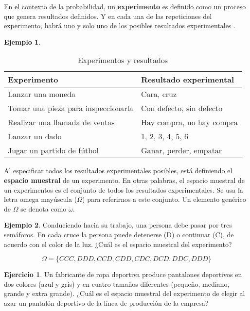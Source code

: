 \documentclass[
]{book}
\theoremstyle{definition}
\theoremstyle{definition}
\newtheorem{example}{Ejemplo}[chapter]
\theoremstyle{definition}
\newtheorem{exercise}{Ejercicio}[chapter]
\theoremstyle{definition}
\theoremstyle{remark}
\begin{document}
En el contexto de la probabilidad, un \textbf{experimento} es definido como un proceso que genera resultados definidos. Y en cada una de las repeticiones del experimento, habrá uno y solo uno de los posibles resultados experimentales \citep[página 143]{anderson}.

\begin{example}
\leavevmode

\begin{table}[H]

\caption{\label{tab:experimentos}Experimentos y resultados}
\centering
\begin{tabular}[t]{ll}
\toprule
Experimento & Resultado experimental\\
\midrule
Lanzar una moneda & Cara, cruz\\
Tomar una pieza para inspeccionarla & Con defecto, sin defecto\\
Realizar una llamada de ventas & Hay compra, no hay compra\\
Lanzar un dado & 1, 2, 3, 4, 5, 6\\
Jugar un partido de fútbol & Ganar, perder, empatar\\
\bottomrule
\end{tabular}
\end{table}

\end{example}

Al especificar todos los resultados experimentales posibles, está definiendo el \textbf{espacio muestral} de un experimento. En otras palabras, el espacio muestral de un experimentos es el conjunto de todos los resultados experimentales. Se usa la letra omega mayúscula (\(\Omega\)) para referirnos a este conjunto. Un elemento genérico de \(\Omega\) se denota como \(\omega\).

\begin{example}
Conduciendo hacia su trabajo, una persona debe pasar por tres semáforos. En cada cruce la persona puede detenerse (D) o continuar (C), de acuerdo con el color de la luz. ¿Cuál es el espacio muestral del experimento?

\[\Omega = \lbrace CCC, DDD, CCD, CDD, CDC, DCD, DDC, DDD \rbrace\]
\end{example}

\begin{exercise}
Un fabricante de ropa deportiva produce pantalones deportivos en dos colores (azul y gris) y en cuatro tamaños diferentes (pequeño, mediano, grande y extra grande). ¿Cuál es el espacio muestral del experimento de elegir al azar un pantalón deportivo de la línea de producción de la empresa?
\end{exercise}
\end{document}
